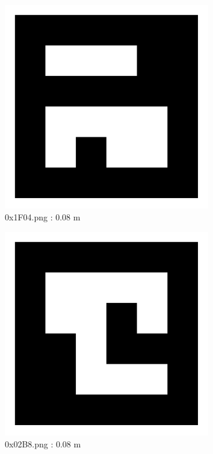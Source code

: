 \documentclass[11pt,a4,BCOR=0cm]{scrartcl}
\begin{document}
\begin{figure}
  \centering
    \includegraphics[width=8.955cm]{0x1F04.pdf}
    \caption{0x1F04.png : 0.08 m}
    \label{fig:0x1F04.pdf}
  
\end{figure} 

\begin{figure}
  \centering
    \includegraphics[width=8.955cm]{0x02B8.pdf}
    \caption{0x02B8.png : 0.08 m}
    \label{fig:0x02B8.pdf}
  
\end{figure} 

\clearpage
\end{document}

